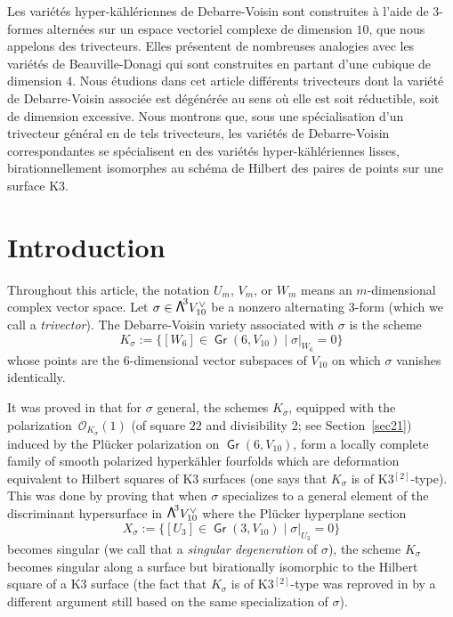 \documentclass[JEP,XML,SOM,Unicode, NoEqCountersInSection,NoFloatCountersInSection]{cedram}
\let\mathcal\mathscr
\theoremstyle{definition}
\newcommand\cO{\mathcal{O}}\let\OO\cO
\DeclareMathOperator{\Gr}{\mathsf{Gr}}
\let\dual\vee
\newcommand\bw[1]{{\hbox{\large$\mathsf{\Lambda}$}^{\!#1}}}
\newcommand\hk{hyperkähler\xspace}
\begin{document}

\begin{altabstract}
Les variétés hyper-kählériennes de Debarre-Voisin sont construites à l'aide de $3$-formes alternées sur un espace vectoriel complexe de dimension $10$, que nous appelons des trivecteurs. Elles présentent de nombreuses analogies avec les variétés de Beauville-Donagi qui sont construites en partant d'une cubique de dimension $4$. Nous étudions dans cet article différents trivecteurs dont la variété de Debarre-Voisin associée est dégénérée au sens où elle est soit réductible, soit de dimension excessive. Nous montrons que, sous une spécialisation d'un trivecteur général en de tels trivecteurs, les variétés de Debarre-Voisin correspondantes se spécialisent en des variétés hyper-kählériennes lisses, birationnellement isomorphes au schéma de Hilbert des paires de points sur une surface K3.
\end{altabstract}
\maketitle

\tableofcontents
\mainmatter

\section{Introduction}
Throughout this article, the notation $U_m$, $V_m$, or $W_m$ means an $m$-dimensional complex vector space. Let $\sigma\in \bw3V_{10}^\dual$ be a nonzero alternating $3$-form (which we call a \emph{trivector}). The Debarre-Voisin variety associated with $\sigma$ is
the scheme
\begin{equation} \label{eqDV}
K_\sigma:=\{[W_6]\in \Gr(6,V_{10}) \mid \sigma\vert_{ W_6}=0\}
\end{equation}
whose points are the 6-dimensional vector subspaces of $V_{10}$ on which $\sigma$ vanishes identically.

It was proved in \cite{devo} that for $\sigma$ general, the schemes $K_\sigma$, equipped with the polarization~$\cO_{K_\sigma}(1)$ (of square $22$ and divisibility 2; see Section~\ref{sec21}) induced by the Plücker polarization on $\Gr(6,V_{10}) $, form a locally complete family
of smooth polarized \hk fourfolds which are deformation equivalent to Hilbert squares
of K3 surfaces (one says that $K_\sigma$ is of K3$^{[2]}$-type). This was done by proving that when $\sigma$ specializes to
a general element of
the discriminant hypersurface in $\bw3V_{10}^\dual$ where the Plücker hyperplane section
\begin{equation}\label{eqxs}
X_{\sigma}:=\{[U_3]\in \Gr(3,V_{10}) \mid \sigma\vert_{U_3}=0\}
\end{equation}
becomes singular (we call that a \emph{singular degeneration} of $\sigma$), the scheme $K_\sigma$ becomes singular along a surface but birationally isomorphic to the Hilbert square
of a K3 surface
(the fact that $K_\sigma$ is of K3$^{[2]}$-type was reproved in \cite{KLSV}
by a different argument still based on the same specialization of $\sigma$).
\end{document}
